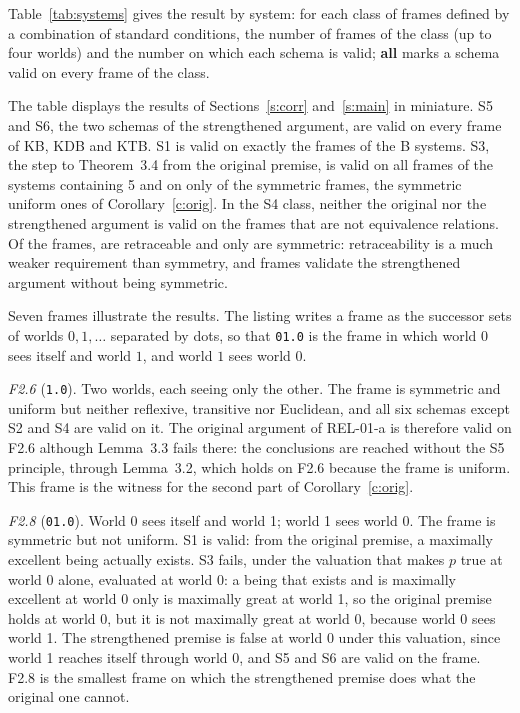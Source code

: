 \documentclass{situationist-preprint}
\begin{document}
Table~\ref{tab:systems} gives the result by system: for each class of frames defined by a combination of standard conditions, the number of frames of the class (up to four worlds) and the number on which each schema is valid; \textbf{all} marks a schema valid on every frame of the class.

\begin{table}[ht]
\caption{Validity of the argument schemas by system, frames with at most four worlds.}\label{tab:systems}

\end{table}

The table displays the results of Sections~\ref{s:corr} and~\ref{s:main} in miniature. S5 and S6, the two schemas of the strengthened argument, are valid on every frame of KB, KDB and KTB. S1 is valid on exactly the frames of the B systems. S3, the step to Theorem~3.4 from the original premise, is valid on all frames of the systems containing 5 and on only \stNumArgOrig{} of the \stNumB{} symmetric frames, the symmetric uniform ones of Corollary~\ref{c:orig}. In the S4 class, neither the original nor the strengthened argument is valid on the frames that are not equivalence relations. Of the \stTotal{} frames, \stNumC{} are retraceable and only \stNumB{} are symmetric: retraceability is a much weaker requirement than symmetry, and \stNumCnotB{} frames validate the strengthened argument without being symmetric.

Seven frames illustrate the results. The listing writes a frame as the successor sets of worlds $0, 1, \ldots$ separated by dots, so that \texttt{01.0} is the frame in which world $0$ sees itself and world $1$, and world $1$ sees world $0$.

\emph{F2.6} (\texttt{1.0}). Two worlds, each seeing only the other. The frame is symmetric and uniform but neither reflexive, transitive nor Euclidean, and all six schemas except S2 and S4 are valid on it. The original argument of REL-01-a is therefore valid on F2.6 although Lemma~3.3 fails there: the conclusions are reached without the S5 principle, through Lemma~3.2, which holds on F2.6 because the frame is uniform. This frame is the witness for the second part of Corollary~\ref{c:orig}.

\emph{F2.8} (\texttt{01.0}). World 0 sees itself and world 1; world 1 sees world 0. The frame is symmetric but not uniform. S1 is valid: from the original premise, a maximally excellent being actually exists. S3 fails, under the valuation that makes $p$ true at world 0 alone, evaluated at world 0: a being that exists and is maximally excellent at world 0 only is maximally great at world 1, so the original premise holds at world 0, but it is not maximally great at world 0, because world 0 sees world 1. The strengthened premise is false at world 0 under this valuation, since world 1 reaches itself through world 0, and S5 and S6 are valid on the frame. F2.8 is the smallest frame on which the strengthened premise does what the original one cannot.
\end{document}
